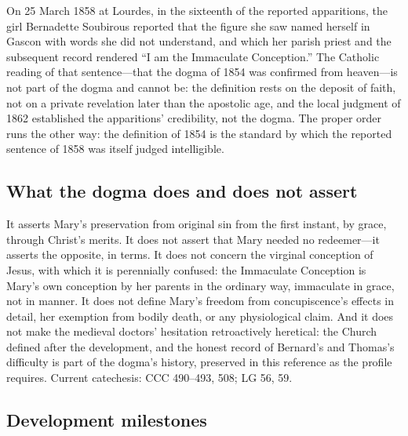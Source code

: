 On 25 March 1858 at Lourdes, in the sixteenth of the reported
apparitions, the girl Bernadette Soubirous reported that the figure she
saw named herself in Gascon with words she did not understand, and which
her parish priest and the subsequent record rendered ``I am the
Immaculate Conception.'' The Catholic reading of that sentence---that
the dogma of 1854 was confirmed from heaven---is not part of the dogma
and cannot be: the definition rests on the deposit of faith, not on a
private revelation later than the apostolic age, and the local judgment
of 1862 established the apparitions' credibility, not the dogma. The
proper order runs the other way: the definition of 1854 is the standard
by which the reported sentence of 1858 was itself judged
intelligible.

\subsection*{What the dogma does and does not assert}

It asserts Mary's preservation from original sin from the first instant,
by grace, through Christ's merits. It does not assert that Mary needed no
redeemer---it asserts the opposite, in terms. It does not concern the
virginal conception of Jesus, with which it is perennially confused: the
Immaculate Conception is Mary's own conception by her parents in the
ordinary way, immaculate in grace, not in manner. It does not define
Mary's freedom from concupiscence's effects in detail, her exemption
from bodily death, or any physiological claim. And it does not make the
medieval doctors' hesitation retroactively heretical: the Church defined
after the development, and the honest record of Bernard's and Thomas's
difficulty is part of the dogma's history, preserved in this reference as
the profile requires. Current catechesis: CCC 490--493, 508; LG 56, 59.

\subsection*{Development milestones}

